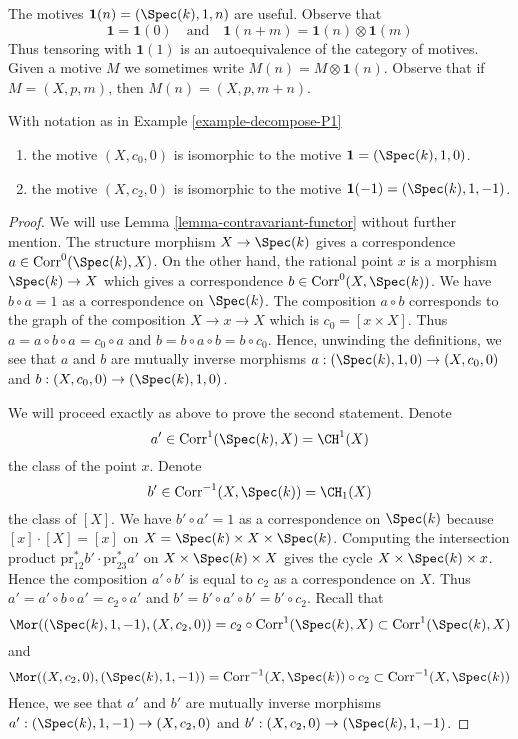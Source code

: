 \noindent
The motives $\mathbf{1}(n) = (\Spec(k), 1, n)$ are useful. Observe that
$$
\mathbf{1} = \mathbf{1}(0)
\quad\text{and}\quad
\mathbf{1}(n + m) = \mathbf{1}(n) \otimes \mathbf{1}(m)
$$
Thus tensoring with $\mathbf{1}(1)$ is an autoequivalence of the
category of motives. Given a motive $M$ we sometimes write
$M(n) = M \otimes \mathbf{1}(n)$. Observe that if $M = (X, p, m)$,
then $M(n) = (X, p, m + n)$.

\begin{lemma}
\label{lemma-inverse-h2}
With notation as in Example \ref{example-decompose-P1}
\begin{enumerate}
\item
the motive $(X, c_0, 0)$ is isomorphic to the motive
$\mathbf{1} = (\Spec(k), 1, 0)$.
\item
the motive $(X, c_2, 0)$ is isomorphic to the motive
$\mathbf{1}(-1) = (\Spec(k), 1, -1)$.
\end{enumerate}
\end{lemma}

\begin{proof}
We will use Lemma \ref{lemma-contravariant-functor} without further mention.
The structure morphism $X \to \Spec(k)$ gives a correspondence
$a \in \text{Corr}^0(\Spec(k), X)$. On the other hand, the rational
point $x$ is a morphism $\Spec(k) \to X$ which gives a correspondence
$b \in \text{Corr}^0(X, \Spec(k))$. We have $b \circ a = 1$ as a
correspondence on $\Spec(k)$. The composition $a \circ b$ corresponds
to the graph of the composition $X \to x \to X$ which is
$c_0 = [x \times X]$. Thus $a = a \circ b \circ a = c_0 \circ a$
and $b = b \circ a \circ b = b \circ c_0$.
Hence, unwinding the definitions, we see that
$a$ and $b$ are mutually inverse morphisms
$a : (\Spec(k), 1, 0) \to (X, c_0, 0)$ and
$b : (X, c_0, 0) \to (\Spec(k), 1, 0)$.

\medskip\noindent
We will proceed exactly as above to prove the second statement.
Denote
$$
a' \in \text{Corr}^1(\Spec(k), X) = \CH^1(X)
$$
the class of the point $x$. Denote
$$
b' \in \text{Corr}^{-1}(X, \Spec(k)) = \CH_1(X)
$$
the class of $[X]$. We have $b' \circ a' = 1$ as a correspondence
on $\Spec(k)$ because $[x] \cdot [X] = [x]$ on
$X = \Spec(k) \times X \times \Spec(k)$. Computing the
intersection product $\text{pr}_{12}^*b' \cdot \text{pr}_{23}^*a'$
on $X \times \Spec(k) \times X$ gives the cycle
$X \times \Spec(k) \times x$. Hence
the composition $a' \circ b'$ is equal to $c_2$ as a
correspondence on $X$. Thus $a' = a' \circ b \circ a' = c_2 \circ a'$
and $b' = b' \circ a' \circ b' = b' \circ c_2$. Recall that
$$
\Mor((\Spec(k), 1, -1), (X, c_2, 0)) =
c_2 \circ \text{Corr}^1(\Spec(k), X)
\subset
\text{Corr}^1(\Spec(k), X)
$$
and
$$
\Mor((X, c_2, 0), (\Spec(k), 1, -1)) =
\text{Corr}^{-1}(X, \Spec(k)) \circ c_2
\subset
\text{Corr}^{-1}(X, \Spec(k))
$$
Hence, we see that $a'$ and $b'$ are mutually inverse morphisms
$a' : (\Spec(k), 1, -1) \to (X, c_2, 0)$ and
$b' : (X, c_2, 0) \to (\Spec(k), 1, -1)$.
\end{proof}

